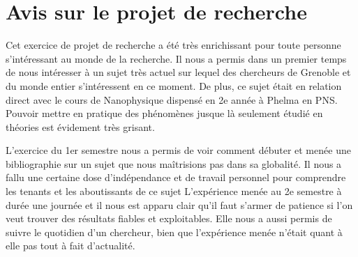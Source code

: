 \section*{Avis sur le projet de recherche}

Cet exercice de projet de recherche a été très enrichissant pour toute personne s'intéressant au monde de la recherche. Il nous a permis dans un premier temps de nous intéresser à un sujet très actuel sur lequel des chercheurs de Grenoble et du monde entier s'intéressent en ce moment. De plus, ce sujet était en relation direct avec le cours de Nanophysique dispensé en 2e année à Phelma en PNS. Pouvoir mettre en pratique des phénomènes jusque là seulement étudié en théories est évidement très grisant.

L'exercice du 1er semestre nous a permis de voir comment débuter et menée une bibliographie sur un sujet que nous maîtrisions pas dans sa globalité. Il nous a fallu une certaine dose d'indépendance et de travail personnel pour comprendre les tenants et les aboutissants de ce sujet
L'expérience menée au 2e semestre à durée une journée et il nous est apparu clair qu'il faut s'armer de patience si l'on veut trouver des résultats fiables et exploitables. Elle nous a aussi permis de suivre le quotidien d'un chercheur, bien que l'expérience menée n'était quant à elle pas tout à fait d'actualité.
